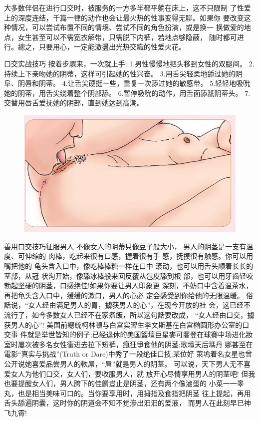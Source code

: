 \documentclass[12pt,UTF8]{ctexbook}
\begin{document}
大多数伴侣在进行口交时，被服务的一方多半都平躺在床上，这不只限制
了性爱上的深度连结，千篇一律的动作也会让最火热的性事变得无聊。如果你
要改变这种情况，可以尝试布置不同的情境、尝试不同的角色扮演，或是换一
换做爱的地点，女生甚至可以不需宽衣解带，只需脱下内裤，若地点够隐蔽，
随时都可进行。總之，只要用心，一定能激盪出光热交織的性爱火花。

口交实战技巧
按着步驟来，一次就上手:
1.男性慢慢地把头移到女性的双腿间。
2.持续上下亲吻她的阴蒂，这样可引起她的性兴奋。
3.用舌尖轻柔地舔过她的阴阜、阴唇和阴蒂。
4.让舌尖硬挺一些，重复一次舔过她的敏感带。
5.轻轻地吸吮她的阴蒂，用舌尖绕着整个阴部舔。
6.暂停吸吮的动作，用舌面舔舐阴蒂头。
7.交替用唇舌爱抚她的阴部，直到她达到高潮。

\begin{figure}[htbp]
	\centering
	\includegraphics[width=0.7\linewidth]{19}
	\caption{}
	\label{fig:1}
\end{figure}

善用口交技巧征服男人
不像女人的阴蒂只像豆子般大小，
男人的阴茎是一支有温度、可伸缩的
肉棒，吃起来很有口感，握着很有手
感，抚摸很有触感。你可以用嘴把他的
龟头含入口中，像吃棒棒糖一样在口中
滾动，也可以用舌头顺着长长的茎部，从冠
状沟开始，像舔冰棒般来回反覆从包皮舔到根
部，也可以用牙齒轻咬勃起坚硬的阴茎，口感绝佳!如果你要让男人印象更
深刻，不妨口中含着温茶水，再把龟头含入口中，缓缓的漱口，男人的心必
定会感受到你给他的无限温暖。
俗話说，“女人经由满足男人的胃，擄获男人的心”，在现今开放的社
会，这已经不流行了，如今多数女人已经不在家煮飯，所以这句話要改成，
“女人经由口交，擄获男人的心”!
美国前總统柯林顿与白宫实習生李文斯基在白宫椭圆形办公室的口交事
件就是举世皆知的例子;已经退休的美国籃壇巨星麥可喬登在球賽中场进化妝室时屢次被多名女性衝进去拉下短裤，瘋狂爭食他的阴茎;歌壇天后瑪丹
娜甚至在電影“真实与挑战”(Truth or Dare)中秀了一段绝佳口技;某位好
萊塢着名女星也曾公开说她喜爱品尝男人的軟屌，“屌”就是男人的阴茎。
可以说，天下男人无不喜爱女人为他们口交，女人们，要收服男人，就
放开心尽情享用男人的阴茎吧!
但我也要提醒女人们，男人胯下的佳餚豈止是阴茎，还有两个像滷蛋的
小菜一一睾丸，也是相当美味可口的。当你要享用时，用拇指及食指把阴茎
往上提起，再用舌头舔遍阴囊，这时你的阴道会不知不觉滲出汨汨的爱液，
而男人在此刻早已神飞九霄!
\end{document}
